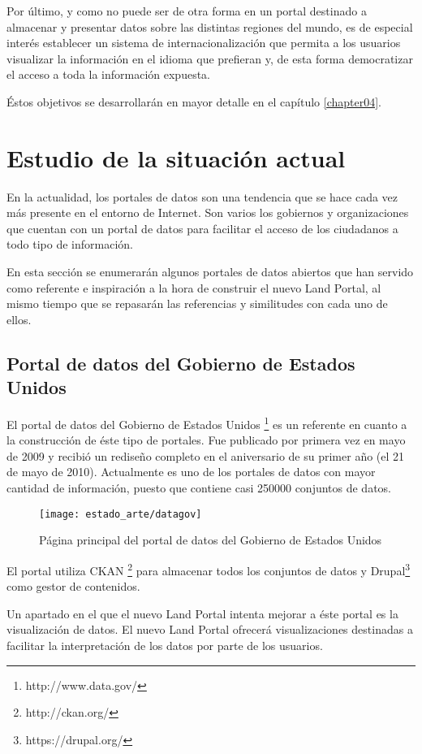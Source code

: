 {Por último, y como no puede ser de otra forma en un portal destinado a almacenar y presentar datos sobre las distintas regiones del mundo, es de especial interés establecer un sistema de internacionalización que permita a los usuarios visualizar la información en el idioma que prefieran y, de esta forma democratizar el acceso a toda la información expuesta.

Éstos objetivos se desarrollarán en mayor detalle en el capítulo \ref{chapter04}.



\section{Estudio de la situación actual}
En la actualidad, los portales de datos son una tendencia que se hace cada vez más presente en el entorno de Internet.  Son varios los gobiernos y organizaciones que cuentan con un portal de datos para facilitar el acceso de los ciudadanos a todo tipo de información.

En esta sección se enumerarán algunos portales de datos abiertos que han servido como referente e inspiración a la hora de construir el nuevo Land Portal, al mismo tiempo que se repasarán las referencias y similitudes con cada uno de ellos.

\subsection{Portal de datos del Gobierno de Estados Unidos}
El portal de datos del Gobierno de Estados Unidos \footnote{http://www.data.gov/} es un referente en cuanto a la construcción de éste tipo de portales.  Fue publicado por primera vez en mayo de 2009 y recibió un rediseño completo en el aniversario de su primer año (el 21 de mayo de 2010).  Actualmente es uno de los portales de datos con mayor cantidad de información, puesto que contiene casi 250000 conjuntos de datos.
\begin{figure}[h]
\centering
\texttt{[image: estado\_arte/datagov]}
\caption{Página principal del portal de datos del Gobierno de Estados Unidos}
\end{figure}

El portal utiliza CKAN \footnote{http://ckan.org/} para almacenar todos los conjuntos de datos y Drupal\footnote{https://drupal.org/} como gestor de contenidos.

Un apartado en el que el nuevo Land Portal intenta mejorar a éste portal es la visualización de datos. El nuevo Land Portal ofrecerá visualizaciones destinadas a facilitar la interpretación de los datos por parte de los usuarios.

}
